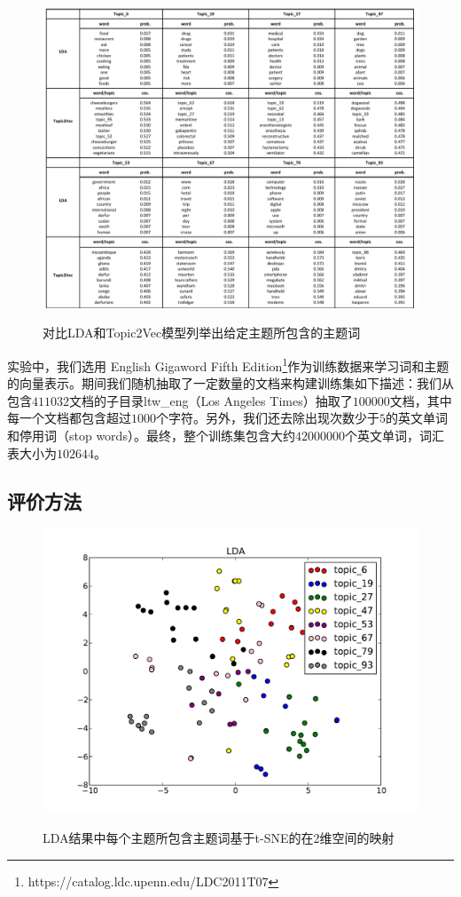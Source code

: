 \documentclass[master]{njuthesis}
\begin{document}
\begin{figure}[t]
  \centering
  \includegraphics[width= 1.0\textwidth]{figures//topic_words_chap3.pdf}\\
  \caption{对比LDA和Topic2Vec模型列举出给定主题所包含的主题词}\label{fig:topic_words_chap3}
\end{figure}

实验中，我们选用 English Gigaword Fifth Edition\footnote{https://catalog.ldc.upenn.edu/LDC2011T07}作为训练数据来学习词和主题的向量表示。期间我们随机抽取了一定数量的文档来构建训练集如下描述：我们从包含$411032$文档的子目录ltw\_eng（Los Angeles Times）抽取了$100000$文档，其中每一个文档都包含超过$1000$个字符。另外，我们还去除出现次数少于$5$的英文单词和停用词（stop words）。最终，整个训练集包含大约$42000000$个英文单词，词汇表大小为$102644$。

\subsection{评价方法}

\begin{figure}[t]
  \centering
  \includegraphics[width= 1.0\textwidth]{figures//lda_tsne_chap3.pdf}\\
  \caption{LDA结果中每个主题所包含主题词基于t-SNE的在2维空间的映射}\label{fig:lda_tsne_chap3}
\end{figure}
\end{document}
